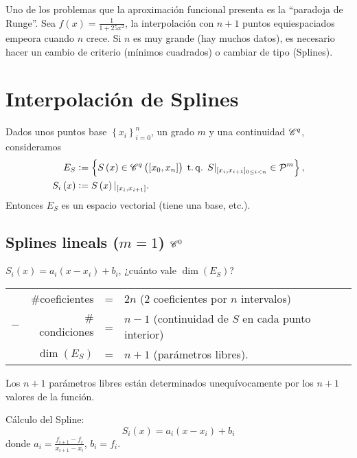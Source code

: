 \begin{obs}
    Uno de los problemas que la aproximaci\'on funcional presenta es la ``paradoja de Runge''. Sea $f\left( x \right) = \frac{1}{1+25x^2}$, la interpolaci\'on con $n+1$ puntos equiespaciados empeora cuando $n$ crece. Si $n$ es muy grande (hay muchos datos), es necesario hacer un cambio de criterio (m\'inimos cuadrados) o cambiar de tipo (Splines).
\end{obs}

\section{Interpolaci\'on de Splines}

\begin{prop}
    Dados unos puntos base $\left\{ x_i \right\}_{i=0}^n$, un grado $m$ y una continuidad $\mathscr{C}^q$, consideramos
    \begin{align*}
        E_{S} &:= \left\{S\left( x \right) \in \mathscr{C}^q\left( \left[ x_0, x_n \right] \right) \operatorname{\;t.q.\;} S\vert_{[ x_i, x_{i+1} ]_{0\leq i<n}} \in \mathcal{P}^m\right\}, \\
        S_i\left( x \right) &:= S\left( x \right)\vert_{[ x_i, x_{i+1} ]}.
    \end{align*}
    Entonces $E_S$ es un espacio vectorial (tiene una base, etc.).
\end{prop}

\subsection{Splines lineals ($m=1$) $\mathscr{C}^0$}

$S_i\left( x \right) = a_i\left( x-x_i \right) + b_i$, ¿cuánto vale $\dim\left( E_S \right)$?
\begin{center}
    \begin{tabular}{crcl}
        & $\#$coeficientes &=& $2n$ (2 coeficientes por $n$ intervalos)\\
        $-$ & $\#$condiciones &=& $n-1$ (continuidad de $S$ en cada punto interior)\\\hline
        &$\dim\left( E_S \right)$ &=& $n+1$ (parámetros libres).
    \end{tabular}
\end{center}

Los $n+1$ parámetros libres están determinados unequívocamente por los $n+1$ valores de la función.

Cálculo del Spline: 
\[
    S_i\left( x \right) = a_i\left( x-x_i \right) + b_i
\]
donde $a_i = \frac{f_{i+1}-f_i}{x_{i+1}-x_i}$, $b_i = f_i$.

